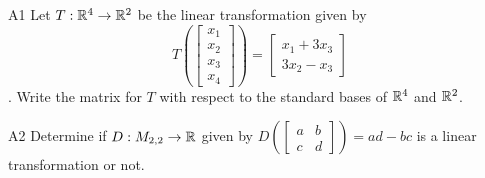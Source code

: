 \documentclass{sbgLAquiz}
\begin{document}
\begin{problem}{A1}
Let $T: \mathbb{R}^4 \rightarrow \mathbb{R}^2$ be the linear transformation given by $$T\left(\begin{bmatrix} x_1 \\ x_2 \\ x_3 \\ x_4 \end{bmatrix} \right) = \begin{bmatrix} x_1+3x_3 \\ 3x_2-x_3 \end{bmatrix}$$. Write the matrix for $T$ with respect to the standard bases of $\mathbb{R}^4$ and $\mathbb{R}^2$.
\end{problem}
\newpage

\begin{problem}{A2}
Determine if $D: M_{2,2} \rightarrow \mathbb{R}$ given by $D\left(\begin{bmatrix} a & b \\ c & d \end{bmatrix} \right) = ad-bc$ is a linear transformation or not.
\end{problem}
\end{document}
